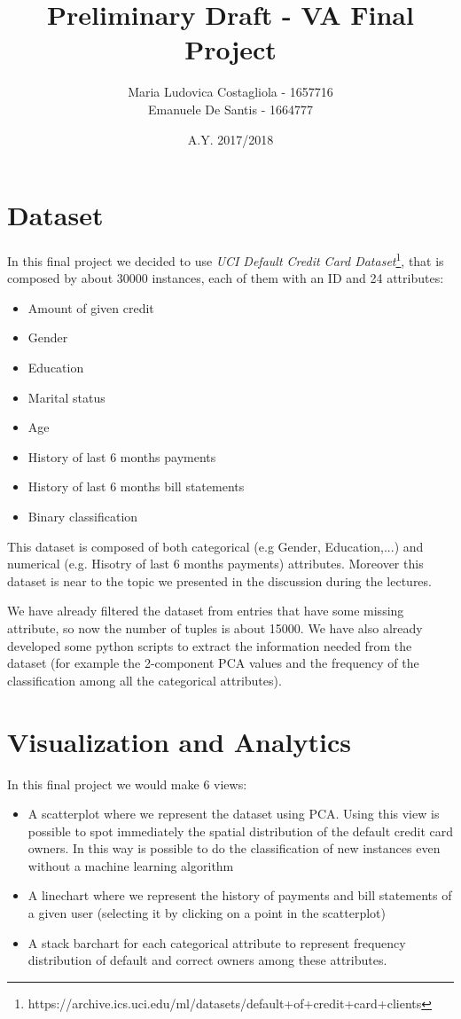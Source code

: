 \documentclass{article}
\title{Preliminary Draft - VA Final Project}
\author{Maria Ludovica Costagliola - 1657716\\
Emanuele De Santis - 1664777}
\date{A.Y. 2017/2018}
\begin{document}
\maketitle
\section{Dataset}

In this final project we decided to use \textit{UCI Default Credit Card Dataset}\footnote{https://archive.ics.uci.edu/ml/datasets/default+of+credit+card+clients}, that is composed by about 30000 instances, each of them with an ID and 24 attributes:
\begin{itemize}
  \item Amount of given credit
  \item Gender
  \item Education
  \item Marital status
  \item Age
  \item History of last 6 months payments
  \item History of last 6 months bill statements
  \item Binary classification
\end{itemize}

This dataset is composed of both categorical (e.g Gender, Education,...) and numerical (e.g. Hisotry of last 6 months payments) attributes. Moreover this dataset is near to the topic we presented in the discussion during the lectures.

We have already filtered the dataset from entries that have some missing attribute, so now the number of tuples is about 15000. We have also already developed some python scripts to extract the information needed from the dataset (for example the 2-component PCA
values and the frequency of the classification among all the categorical attributes).

\section{Visualization and Analytics}

In this final project we would make 6 views:
\begin{itemize}
  \item A scatterplot where we represent the dataset using PCA. Using this view is possible to spot immediately the spatial distribution of the default credit card owners. In this way is possible to do the classification of new instances even without a machine learning algorithm
  \item A linechart where we represent the history of payments and bill statements of a given user (selecting it by clicking on a point in the scatterplot)
  \item A stack barchart for each categorical attribute to represent frequency distribution of default and correct owners among these attributes.
\end{itemize}
\end{document}
